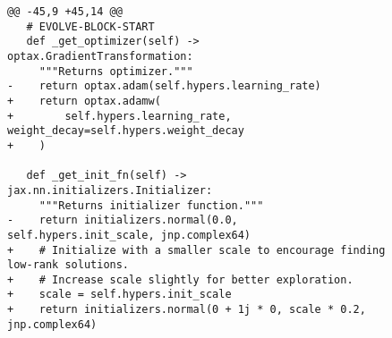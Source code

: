 \begin{figure}[p]
\renewcommand{\thefigure}{\arabic{figure}a}\vspace{-0.03\textwidth}
\begin{adjustbox}{width=0.9\textwidth}
\begin{minipage}{0.9\textwidth}
\begin{lstlisting}[style=pydiff, backgroundcolor=\color{backcolour}]
@@ -45,9 +45,14 @@
   # EVOLVE-BLOCK-START
   def _get_optimizer(self) -> optax.GradientTransformation:
     """Returns optimizer."""
-    return optax.adam(self.hypers.learning_rate)
+    return optax.adamw(
+        self.hypers.learning_rate, weight_decay=self.hypers.weight_decay
+    )
 
   def _get_init_fn(self) -> jax.nn.initializers.Initializer:
     """Returns initializer function."""
-    return initializers.normal(0.0, self.hypers.init_scale, jnp.complex64)
+    # Initialize with a smaller scale to encourage finding low-rank solutions.
+    # Increase scale slightly for better exploration.
+    scale = self.hypers.init_scale
+    return initializers.normal(0 + 1j * 0, scale * 0.2, jnp.complex64)


\end{lstlisting}
\end{minipage}
\end{adjustbox}
\end{figure}
